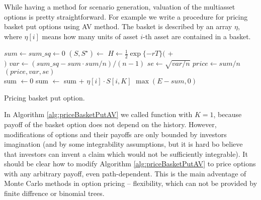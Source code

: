 \documentclass[a4paper,12pt, oneside]{book}
\theoremstyle{definition}
\theoremstyle{remark}
\begin{document}
While having a method for scenario generation, valuation of the multiasset options is pretty straightforward. For example we write a procedure for pricing basket put options using AV method. The basket is described by an array $\eta$, where $\eta[i]$ means how many units of asset $i$-th asset are contained in a basket.

\begin{algorithm}
 \begin{algorithmic}[1]
  \State  $sum \gets sum\_sq \gets 0$
    \State $(S, S^\star) \gets$ 
    \State $H \gets \frac{1}{2}\exp\{-rT\} ($  +\\ 
    \hspace{132pt}  $)$
  \EndFor
  \State $var \gets (sum\_sq - sum \cdot sum/n) / (n-1)$
  \State $se \gets \sqrt{var / n}$
  \State $price \gets sum / n$
  \State \Return $(price, var, se)$
  \EndFunction
  \\
    \State sum $\gets 0$
      \State sum $\gets$ sum + $\eta[i]\cdot S[i, K]$
    \EndFor
    \State \Return $\max(E - sum, 0)$
  \EndFunction
 \end{algorithmic}
 \caption{Pricing basket put option.}
 \label{alg:priceBasketPutAV}
\end{algorithm}


In Algorithm \ref{alg:priceBasketPutAV} we called function  with $K=1$, because payoff of the basket option does not depend on the history. However, modifications of options and their payoffs are only bounded by investors imagination (and by some integrability assumptions, but it is hard bo believe that investors can invent a claim which would not be sufficiently integrable).
It should be clear how to modify Algorithm \ref{alg:priceBasketPutAV} to price options with any arbitrary payoff, even path-dependent. This is the main adventage of Monte Carlo methods in option pricing -- flexibility, which can not be provided by finite diffrence or binomial trees.
\end{document}
